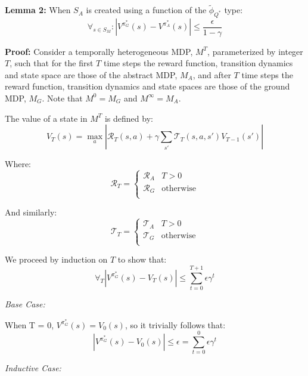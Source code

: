 \documentclass{article}
\newcommand{\ep}{\widetilde \phi}
\begin{document}
{\bf Lemma 2:} When $S_A$ is created using a function of the $\ep_{Q^*}$ type:
\begin{equation}
\forall_{s \in S_M} : | V^{\pi^*_G}(s) - V^{\pi^*_{A}}(s) | \leq \frac{\epsilon}{1-\gamma}
\end{equation}

\textbf{Proof:}
Consider a temporally heterogeneous \ac{MDP}, $M^T$, parameterized by integer $T$, such that for the first $T$ time steps the reward function, transition dynamics and state space are those of the abstract MDP, $M_A$, and after $T$ time steps the reward function, transition dynamics and state spaces are those of the ground MDP, $M_G$. Note that $M^0 = M_G$ and $M^\infty = M_A$.

The value of a state in $M^T$ is defined by:
\begin{equation}
V_T(s) = \max_a \left| \mathcal{R}_T(s,a) + \gamma \sum_{s'} \mathcal{T}_T(s,a,s') V_{T-1}(s') \right|
\end{equation}

Where:
\begin{equation}
\mathcal{R}_T = \begin{cases}
\mathcal{R}_A& T > 0 \\
\mathcal{R}_G& \text{otherwise} \\
\end{cases}
\end{equation}

And similarly:
\begin{equation}
\mathcal{T}_T = \begin{cases}
\mathcal{T}_A& T > 0 \\
\mathcal{T}_G& \text{otherwise} \\
\end{cases}
\end{equation}

We proceed by induction on $T$ to show that:
\begin{equation}
\forall_T |V^{\pi_G^*}(s) - V_T(s)| \leq \sum_{t=0}^{T+1} \epsilon \gamma^t
\end{equation}

\textit{Base Case:}

When T = 0, $V^{\pi_G^*}(s) = V_0(s)$, so it trivially follows that:
\begin{equation}
|V^{\pi_G^*}(s) - V_0(s)| \leq \epsilon = \sum_{t=0}^{0} \epsilon \gamma^t
\end{equation}

\textit{Inductive Case:}
\end{document}
